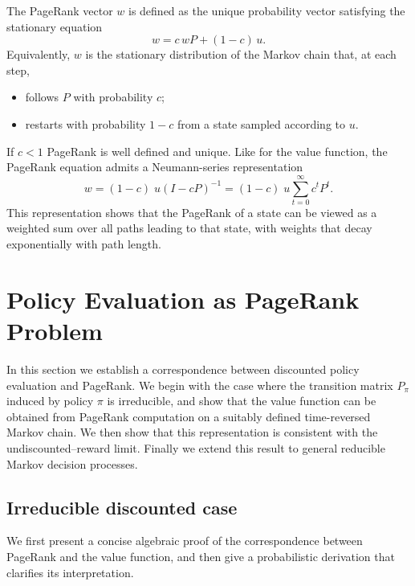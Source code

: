 \documentclass[letterpaper, 10 pt, conference]{ieeeconf}
\begin{document}
The PageRank vector $w$ is defined as the unique probability vector satisfying
the stationary equation
\begin{equation}
\label{eq:pagerank}
w = c\, w P + (1-c)\, u .
\end{equation}
Equivalently, $w$ is the stationary distribution of the Markov chain that, at
each step,
\begin{itemize}
    \item follows $P$ with probability $c$;
    \item 
    restarts with probability
    $1-c$ from a state sampled according to $u$.
\end{itemize}

If $c<1$ PageRank is well defined and unique. Like for the value function, the PageRank equation admits a Neumann-series representation
$$
w = (1-c)\;u (I-c P)^{-1} =(1-c)\;u\sum_{t=0}^\infty c^t P^t.
$$
This representation shows that the PageRank of a state can be viewed as a weighted sum over all paths leading to that state, with weights that decay exponentially with path length.


\section{Policy Evaluation as PageRank Problem}
\label{sec:3}

In this section we establish a correspondence between discounted policy
evaluation and PageRank.
We begin with the case where the transition matrix $P_\pi$ induced by policy $\pi$ is irreducible, and show that the value function can be obtained from PageRank computation on a suitably defined time-reversed
Markov chain.
We then show that this representation is consistent with the undiscounted--reward limit. Finally we extend this result to general reducible Markov decision
processes.

\subsection{Irreducible discounted case}

We first present a concise algebraic proof of the correspondence between PageRank and the value function, and then give a
probabilistic derivation that clarifies its interpretation.
\end{document}
